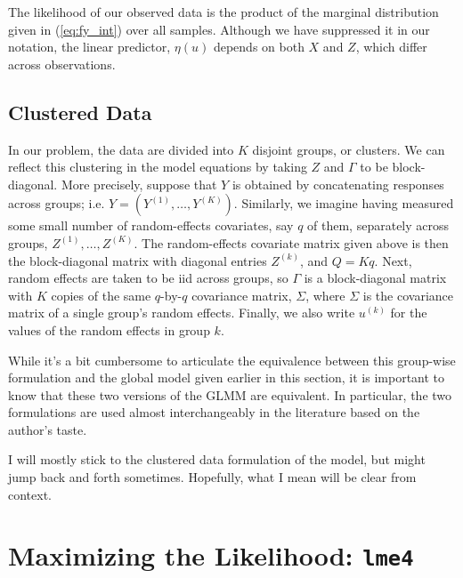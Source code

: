 \documentclass{article}
\begin{document}
The likelihood of our observed data is the product of the marginal distribution given in (\ref{eq:fy_int}) over all samples. Although we have suppressed it in our notation, the linear predictor, $\eta(u)$ depends on both $X$ and $Z$, which differ across observations. 


\subsection{Clustered Data}
In our problem, the data are divided into $K$ disjoint groups, or clusters. We can reflect this clustering in the model equations by taking $Z$ and $\Gamma$ to be block-diagonal. More precisely, suppose that $Y$ is obtained by concatenating responses across groups; i.e. $Y = (Y^{(1)}, \ldots, Y^{(K)})$. Similarly, we imagine having measured some small number of random-effects covariates, say $q$ of them, separately across groups, $Z^{(1)}, \ldots, Z^{(K)}$. The random-effects covariate matrix given above is then the block-diagonal matrix with diagonal entries $Z^{(k)}$, and $Q = Kq$. Next, random effects are taken to be iid across groups, so $\Gamma$ is a block-diagonal matrix with $K$ copies of the same $q$-by-$q$ covariance matrix, $\Sigma$, where $\Sigma$ is the covariance matrix of a single group's random effects. Finally, we also write $u^{(k)}$ for the values of the random effects in group $k$.

While it's a bit cumbersome to articulate the equivalence between this group-wise formulation and the global model given earlier in this section, it is important to know that these two versions of the GLMM are equivalent. In particular, the two formulations are used almost interchangeably in the literature based on the author's taste.

I will mostly stick to the clustered data formulation of the model, but might jump back and forth sometimes. Hopefully, what I mean will be clear from context.


\section{Maximizing the Likelihood: \texttt{lme4}}
\label{sec:lme4}
\end{document}
